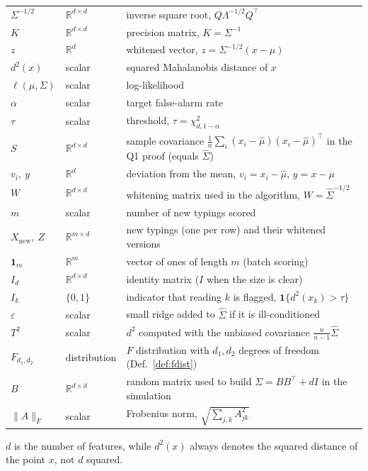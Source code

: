 \documentclass[11pt]{article}
\theoremstyle{definition}
\newcommand{\R}{\mathbb{R}}
\newcommand{\T}{^{\top}}
\begin{document}
\begin{center}
\begin{tabular}{@{}lll@{}}
$\Sigma^{-1/2}$ & $\R^{d\times d}$ & inverse square root, $Q\Lambda^{-1/2}Q\T$ \\
$K$ & $\R^{d\times d}$ & precision matrix, $K=\Sigma^{-1}$ \\
$z$ & $\R^{d}$ & whitened vector, $z=\Sigma^{-1/2}(x-\mu)$ \\
$d^2(x)$ & scalar & squared Mahalanobis distance of $x$ \\
$\ell(\mu,\Sigma)$ & scalar & log-likelihood \\
$\alpha$ & scalar & target false-alarm rate \\
$\tau$ & scalar & threshold, $\tau=\chi^2_{d,1-\alpha}$ \\
$S$ & $\R^{d\times d}$ & sample covariance $\frac1n\sum_i(x_i-\hat\mu)(x_i-\hat\mu)\T$ in the Q1 proof (equals $\hat\Sigma$) \\
$v_i,\ y$ & $\R^{d}$ & deviation from the mean, $v_i=x_i-\hat\mu$, $y=x-\mu$ \\
$W$ & $\R^{d\times d}$ & whitening matrix used in the algorithm, $W=\hat\Sigma^{-1/2}$ \\
$m$ & scalar & number of new typings scored \\
$X_{\text{new}},\ Z$ & $\R^{m\times d}$ & new typings (one per row) and their whitened versions \\
$\mathbf 1_m$ & $\R^{m}$ & vector of ones of length $m$ (batch scoring) \\
$I_d$ & $\R^{d\times d}$ & identity matrix ($I$ when the size is clear) \\
$I_k$ & $\{0,1\}$ & indicator that reading $k$ is flagged, $\mathbf 1\{d^2(x_k)>\tau\}$ \\
$\varepsilon$ & scalar & small ridge added to $\hat\Sigma$ if it is ill-conditioned \\
$T^2$ & scalar & $d^2$ computed with the unbiased covariance $\frac{n}{n-1}\hat\Sigma$ \\
$F_{d_1,d_2}$ & distribution & $F$ distribution with $d_1,d_2$ degrees of freedom (Def.~\ref{def:fdist}) \\
$B$ & $\R^{d\times d}$ & random matrix used to build $\Sigma=BB\T+dI$ in the simulation \\
$\|A\|_F$ & scalar & Frobenius norm, $\sqrt{\sum_{j,k}A_{jk}^2}$ \\
\bottomrule
\end{tabular}
\end{center}
$d$ is the number of features, while $d^2(x)$ always denotes the squared distance of the point $x$, not $d$ squared.
\end{document}
